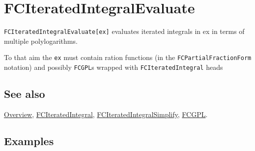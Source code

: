\documentclass[../FeynCalcManual.tex]{subfiles}
\begin{document}
\hypertarget{fciteratedintegralevaluate}{
\section{FCIteratedIntegralEvaluate}\label{fciteratedintegralevaluate}}

\texttt{FCIteratedIntegralEvaluate[\allowbreak{}ex]} evaluates iterated
integrals in ex in terms of multiple polylogarithms.

To that aim the \texttt{ex} must contain ration functions (in the
\texttt{FCPartialFractionForm} notation) and possibly \texttt{FCGPL}s
wrapped with \texttt{FCIteratedIntegral} heads

\subsection{See also}

\hyperlink{toc}{Overview},
\hyperlink{fciteratedintegral}{FCIteratedIntegral},
\hyperlink{fciteratedintegralsimplify}{FCIteratedIntegralSimplify},
\hyperlink{fcgpl}{FCGPL}.

\subsection{Examples}

\begin{Shaded}
\begin{Highlighting}[]
\ExtensionTok{=}\OperatorTok{[}\OperatorTok{,} \OperatorTok{\{\{\{}\SpecialCharTok{{-}} \SpecialCharTok{+} \OperatorTok{[}\OperatorTok{],} \SpecialCharTok{{-}}\OperatorTok{\},}\NormalTok{ (} \SpecialCharTok{+}  \SpecialCharTok{+} \OperatorTok{[}\OperatorTok{]}\NormalTok{)}\SpecialCharTok{\^{}}\NormalTok{(}\SpecialCharTok{{-}}\NormalTok{)}\OperatorTok{\},} 
    \OperatorTok{\{\{} \SpecialCharTok{+} \OperatorTok{[}\OperatorTok{]} \SpecialCharTok{+} \OperatorTok{[}\OperatorTok{],} \SpecialCharTok{{-}}\OperatorTok{\},} \SpecialCharTok{{-}}\NormalTok{(} \SpecialCharTok{+}  \SpecialCharTok{+} \OperatorTok{[}\OperatorTok{]}\NormalTok{)}\SpecialCharTok{\^{}}\NormalTok{(}\SpecialCharTok{{-}}\NormalTok{)}\OperatorTok{\},} \OperatorTok{\{\{} \SpecialCharTok{+} \OperatorTok{[}\OperatorTok{]} \SpecialCharTok{+} \OperatorTok{[}\OperatorTok{],} \SpecialCharTok{{-}}\OperatorTok{\},} \SpecialCharTok{{-}}\NormalTok{(} \SpecialCharTok{+}  \SpecialCharTok{+} \OperatorTok{[}\OperatorTok{]}\NormalTok{)}\SpecialCharTok{\^{}}\NormalTok{(}\SpecialCharTok{{-}}\NormalTok{)}\OperatorTok{\}\},} \OperatorTok{[}\OperatorTok{]]}
\end{Highlighting}
\end{Shaded}
\end{document}
